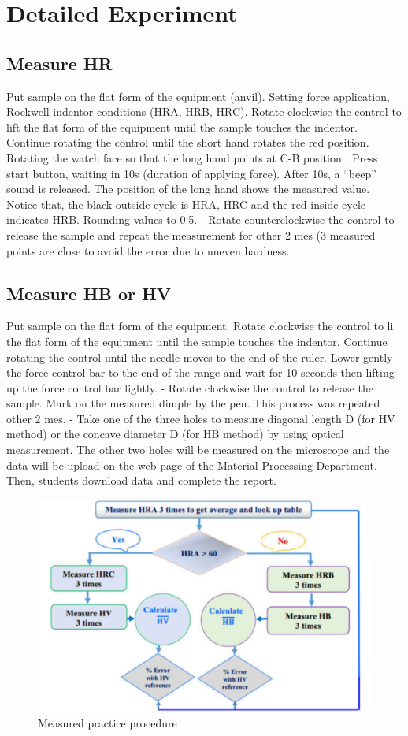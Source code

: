 \section{Detailed Experiment}
\subsection{Measure HR}
Put sample on the flat form of the equipment (anvil). Setting force application, Rockwell indentor conditions (HRA, HRB, HRC). Rotate clockwise the control to lift the flat form of the equipment until the sample touches the indentor. Continue rotating the control until the short hand rotates the red position. Rotating the watch face so that the long hand points at C-B position . Press start button, waiting in 10s (duration of applying force). After 10s, a “beep” sound is released. The position of the long hand shows the measured value. Notice that, the black outside cycle is HRA, HRC and the red inside cycle indicates HRB. Rounding values to 0.5. - Rotate counterclockwise the control to release the sample and repeat the measurement for other 2 mes (3 measured points are close to avoid the error due to uneven hardness.
\subsection{Measure HB or HV}
Put sample on the flat form of the equipment. Rotate clockwise the control to li the flat form of the equipment until the sample touches the indentor. Continue rotating the control until the needle moves to the end of the ruler. Lower gently the force control bar to the end of the range and wait for 10 seconds then lifting up the force control bar lightly. - Rotate clockwise the control to release the sample. Mark on the measured dimple by the pen. This process was repeated other 2 mes. - Take one of the three holes to measure diagonal length D (for HV method) or the concave diameter D (for HB method) by using optical measurement. The other two holes will be measured on the microscope and the data will be upload on the web page of the Material Processing Department. Then, students download data and complete the report.
\begin{figure}
	\centering
	\includegraphics[width=150mm]{2020-07-19 14.04.25 oemmndcbldboiebfnladdacbdfmadadm 4d3397925039.png}
	\caption{Measured practice procedure}
\end{figure}

